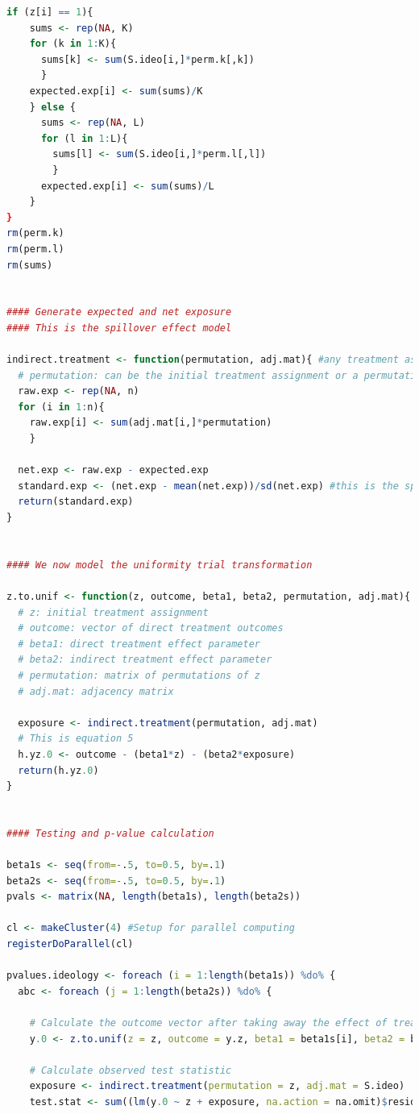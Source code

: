\documentclass[12pt]{article}
\begin{document}
\begin{lstlisting}[language=R]
  if (z[i] == 1){
    sums <- rep(NA, K)
    for (k in 1:K){
      sums[k] <- sum(S.ideo[i,]*perm.k[,k])
      }
    expected.exp[i] <- sum(sums)/K
    } else {
      sums <- rep(NA, L)
      for (l in 1:L){
        sums[l] <- sum(S.ideo[i,]*perm.l[,l])
        }
      expected.exp[i] <- sum(sums)/L
    }
}
rm(perm.k)
rm(perm.l)
rm(sums)


#### Generate expected and net exposure
#### This is the spillover effect model

indirect.treatment <- function(permutation, adj.mat){ #any treatment assignment vector and adjacency matrix can be used
  # permutation: can be the initial treatment assignment or a permutation
  raw.exp <- rep(NA, n)
  for (i in 1:n){
    raw.exp[i] <- sum(adj.mat[i,]*permutation)
    }
  
  net.exp <- raw.exp - expected.exp
  standard.exp <- (net.exp - mean(net.exp))/sd(net.exp) #this is the spillover or indirect effect
  return(standard.exp)
}


#### We now model the uniformity trial transformation

z.to.unif <- function(z, outcome, beta1, beta2, permutation, adj.mat){
  # z: initial treatment assignment
  # outcome: vector of direct treatment outcomes
  # beta1: direct treatment effect parameter
  # beta2: indirect treatment effect parameter
  # permutation: matrix of permutations of z
  # adj.mat: adjacency matrix
  
  exposure <- indirect.treatment(permutation, adj.mat)
  # This is equation 5
  h.yz.0 <- outcome - (beta1*z) - (beta2*exposure)
  return(h.yz.0)
}


#### Testing and p-value calculation

beta1s <- seq(from=-.5, to=0.5, by=.1)
beta2s <- seq(from=-.5, to=0.5, by=.1)
pvals <- matrix(NA, length(beta1s), length(beta2s))

cl <- makeCluster(4) #Setup for parallel computing
registerDoParallel(cl)

pvalues.ideology <- foreach (i = 1:length(beta1s)) %do% {
  abc <- foreach (j = 1:length(beta2s)) %do% {
    
    # Calculate the outcome vector after taking away the effect of treatment
    y.0 <- z.to.unif(z = z, outcome = y.z, beta1 = beta1s[i], beta2 = beta2s[j], permutation = perm, adj.mat = S.ideo)
    
    # Calculate observed test statistic
    exposure <- indirect.treatment(permutation = z, adj.mat = S.ideo)
    test.stat <- sum((lm(y.0 ~ z + exposure, na.action = na.omit)$resid)^2)
    

\end{lstlisting}
\end{document}
